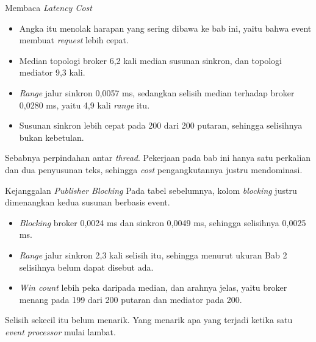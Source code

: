 \documentclass[aspectratio=169, table, 12pt]{beamer}
\begin{document}
\begin{frame}{{\Large Membaca \textit{Latency Cost}}}
  \vspace{10pt}
  \begin{itemize}\small
    \item Angka itu menolak harapan yang sering dibawa ke bab ini, yaitu bahwa
          event membuat \textit{request} lebih cepat.
    \item Median topologi broker 6,2 kali median susunan sinkron, dan topologi
          mediator 9,3 kali.
    \item \textit{Range} jalur sinkron 0,0057 ms, sedangkan selisih median
          terhadap broker 0,0280 ms, yaitu 4,9 kali \textit{range} itu.
    \item Susunan sinkron lebih cepat pada 200 dari 200 putaran, sehingga
          selisihnya bukan kebetulan.
  \end{itemize}

  \vspace{10pt}
  {\small Sebabnya perpindahan antar \textit{thread}. Pekerjaan pada bab ini
  hanya satu perkalian dan dua penyusunan teks, sehingga \textit{cost}
  pengangkutannya justru mendominasi.}
\end{frame}

\begin{frame}{{\Large Kejanggalan \textit{Publisher Blocking}}}
  \vspace{8pt}
  {\small Pada tabel sebelumnya, kolom \textit{blocking} justru dimenangkan
  kedua susunan berbasis event.}

  \vspace{8pt}
  \begin{itemize}\small
    \item \textit{Blocking} broker 0,0024 ms dan sinkron 0,0049 ms, sehingga
          selisihnya 0,0025 ms.
    \item \textit{Range} jalur sinkron 2,3 kali selisih itu, sehingga menurut
          ukuran Bab 2 selisihnya belum dapat disebut ada.
    \item \textit{Win count} lebih peka daripada median, dan arahnya jelas,
          yaitu broker menang pada 199 dari 200 putaran dan mediator pada 200.
  \end{itemize}

  \vspace{8pt}
  {\small Selisih sekecil itu belum menarik. Yang menarik apa yang terjadi
  ketika satu \textit{event processor} mulai lambat.}
\end{frame}
\end{document}
